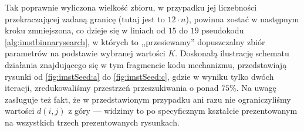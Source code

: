 {Tak poprawnie wyliczona wielkość zbioru, w przypadku jej liczebności przekraczającej zadaną granicę (tutaj jest to $12 \cdot n$), powinna zostać w następnym kroku zmniejszona, co dzieje się w liniach od $15$ do $19$ pseudokodu \ref{alg:imstbinnarysearch}, w których to ,,przesiewamy'' dopuszczalny zbiór parametrów na podstawie wybranej wartości $K$. Doskonałą ilustrację schematu działania znajdującego się w tym fragmencie kodu mechanizmu, przedstawiają rysunki od \ref{fig:imstSeed:a} do \ref{fig:imstSeed:c}, gdzie w wyniku tylko dwóch iteracji, zredukowaliśmy przestrzeń przeszukiwania o ponad $75\%$. Na uwagę zasługuje też fakt, że w przedstawionym przypadku ani razu nie ograniczyliśmy wartości $d \left( i, j \right)$ z góry --- widzimy to po specyficznym kształcie prezentowanym na wszystkich trzech prezentowanych rysunkach.

}
